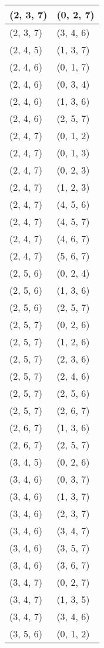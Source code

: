 \begin{footnotesize}
\begin{longtable}[c]{|l|l|}
(2, 3, 7)
&(0, 2, 7)
\\ \hline
(2, 3, 7)
&(3, 4, 6)
\\ \hline
(2, 4, 5)
&(1, 3, 7)
\\ \hline
(2, 4, 6)
&(0, 1, 7)
\\ \hline
(2, 4, 6)
&(0, 3, 4)
\\ \hline
(2, 4, 6)
&(1, 3, 6)
\\ \hline
(2, 4, 6)
&(2, 5, 7)
\\ \hline
(2, 4, 7)
&(0, 1, 2)
\\ \hline
(2, 4, 7)
&(0, 1, 3)
\\ \hline
(2, 4, 7)
&(0, 2, 3)
\\ \hline
(2, 4, 7)
&(1, 2, 3)
\\ \hline
(2, 4, 7)
&(4, 5, 6)
\\ \hline
(2, 4, 7)
&(4, 5, 7)
\\ \hline
(2, 4, 7)
&(4, 6, 7)
\\ \hline
(2, 4, 7)
&(5, 6, 7)
\\ \hline
(2, 5, 6)
&(0, 2, 4)
\\ \hline
(2, 5, 6)
&(1, 3, 6)
\\ \hline
(2, 5, 6)
&(2, 5, 7)
\\ \hline
(2, 5, 7)
&(0, 2, 6)
\\ \hline
(2, 5, 7)
&(1, 2, 6)
\\ \hline
(2, 5, 7)
&(2, 3, 6)
\\ \hline
(2, 5, 7)
&(2, 4, 6)
\\ \hline
(2, 5, 7)
&(2, 5, 6)
\\ \hline
(2, 5, 7)
&(2, 6, 7)
\\ \hline
(2, 6, 7)
&(1, 3, 6)
\\ \hline
(2, 6, 7)
&(2, 5, 7)
\\ \hline
(3, 4, 5)
&(0, 2, 6)
\\ \hline
(3, 4, 6)
&(0, 3, 7)
\\ \hline
(3, 4, 6)
&(1, 3, 7)
\\ \hline
(3, 4, 6)
&(2, 3, 7)
\\ \hline
(3, 4, 6)
&(3, 4, 7)
\\ \hline
(3, 4, 6)
&(3, 5, 7)
\\ \hline
(3, 4, 6)
&(3, 6, 7)
\\ \hline
(3, 4, 7)
&(0, 2, 7)
\\ \hline
(3, 4, 7)
&(1, 3, 5)
\\ \hline
(3, 4, 7)
&(3, 4, 6)
\\ \hline
(3, 5, 6)
&(0, 1, 2)
\\ \hline

\end{longtable}
\end{footnotesize}
